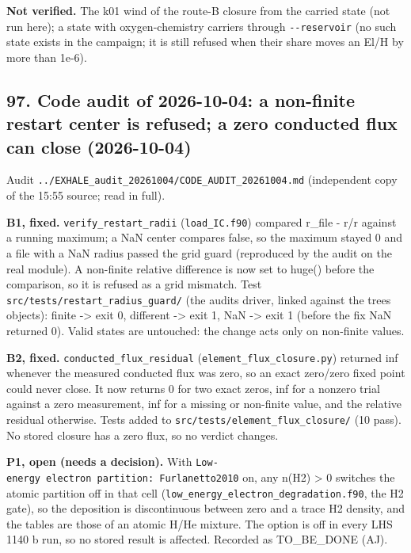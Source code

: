 \documentclass[english,a4paper]{my_memo}
\begin{document}
\textbf{Not verified.} The k01 wind of the route-B closure from the carried state
(not run here); a state with oxygen-chemistry carriers through
\texttt{-\/-reservoir} (no such state exists in the campaign; it is still refused when
their share moves an El/H by more than 1e-6).

\subsection{97. Code audit of 2026-10-04: a non-finite restart center is refused; a zero conducted flux can close (2026-10-04)}\label{97-code-audit-of-2026-10-04-a-non-finite-restart-center-is-refused-a-zero-conducted-flux-can-close-2026-10-04}

Audit \texttt{../EXHALE\_audit\_20261004/CODE\_AUDIT\_20261004.md} (independent copy
of the 15:55 source; read in full).

\textbf{B1, fixed.} \texttt{verify\_restart\_radii} (\texttt{load\_IC.f90}) compared
\textbar r\_file - r\textbar/\textbar r\textbar{} against a running maximum; a NaN center compares false, so
the maximum stayed 0 and a file with a NaN radius passed the grid guard
(reproduced by the audit on the real module). A non-finite relative
difference is now set to huge() before the comparison, so it is refused as
a grid mismatch. Test \texttt{src/tests/restart\_radius\_guard/} (the audit\textquotesingle s driver,
linked against the tree\textquotesingle s objects): finite -\textgreater{} exit 0, different -\textgreater{} exit 1,
NaN -\textgreater{} exit 1 (before the fix NaN returned 0). Valid states are untouched:
the change acts only on non-finite values.

\textbf{B2, fixed.} \texttt{conducted\_flux\_residual} (\texttt{element\_flux\_closure.py})
returned inf whenever the measured conducted flux was zero, so an exact
zero/zero fixed point could never close. It now returns 0 for two exact
zeros, inf for a nonzero trial against a zero measurement, inf for a
missing or non-finite value, and the relative residual otherwise. Tests
added to \texttt{src/tests/element\_flux\_closure/} (10 pass). No stored closure has
a zero flux, so no verdict changes.

\textbf{P1, open (needs a decision).} With \texttt{Low-energy\ electron\ partition:\ Furlanetto2010} on, any n(H2) \textgreater{} 0 switches the atomic partition off in that
cell (\texttt{low\_energy\_electron\_degradation.f90}, the H2 gate), so the deposition
is discontinuous between zero and a trace H2 density, and the tables are
those of an atomic H/He mixture. The option is off in every LHS 1140 b run,
so no stored result is affected. Recorded as TO\_BE\_DONE (AJ).
\end{document}
